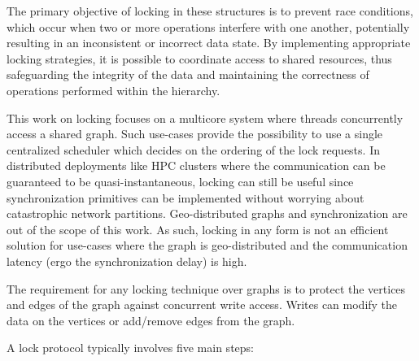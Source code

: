 The primary objective of locking in these structures is to prevent race conditions, which occur when two or more operations interfere with one another, potentially resulting in an inconsistent or incorrect data state. By implementing appropriate locking strategies, it is possible to coordinate access to shared resources, thus safeguarding the integrity of the data and maintaining the correctness of operations performed within the hierarchy.

This work on locking focuses on a multicore system where threads concurrently access a shared graph. Such use-cases provide the possibility to use a single centralized scheduler which decides on the ordering of the lock requests. In distributed deployments like HPC clusters where the communication can be guaranteed to be quasi-instantaneous, locking can still be useful since synchronization primitives can be implemented without worrying about catastrophic network partitions. Geo-distributed graphs and synchronization are out of the scope of this work. As such, locking in any form is not an efficient solution for use-cases where the graph is geo-distributed and the communication latency (ergo the synchronization delay) is high. 

The requirement for any locking technique over graphs is to protect the vertices and edges of the graph against concurrent write access. Writes can modify the data on the vertices or add/remove edges from the graph. 

A lock protocol typically involves five main steps:

